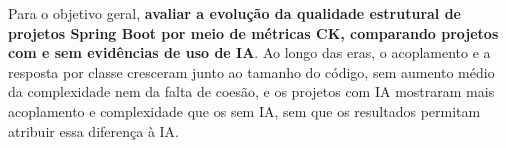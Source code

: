 Para o objetivo geral, \textbf{avaliar a evolução da qualidade estrutural de projetos Spring Boot por meio de métricas CK, comparando projetos com e sem evidências de uso de IA}. Ao longo das eras, o acoplamento e a resposta por classe cresceram junto ao tamanho do código, sem aumento médio da complexidade nem da falta de coesão, e os projetos com IA mostraram mais acoplamento e complexidade que os sem IA, sem que os resultados permitam atribuir essa diferença à IA.
